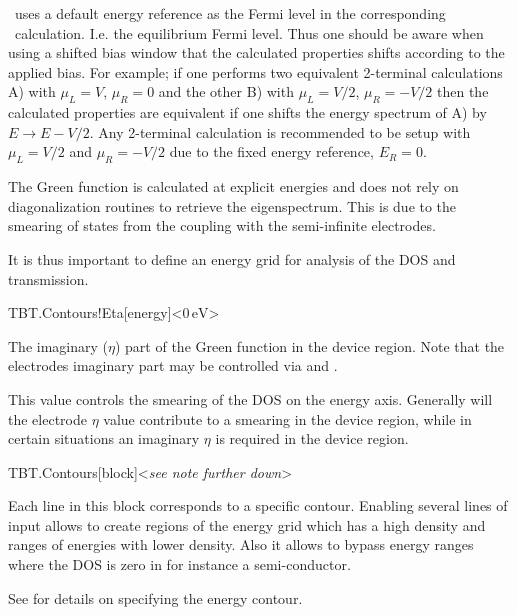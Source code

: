 \tbtrans\ uses a default energy reference as the Fermi level in the
corresponding \tsiesta\ calculation. I.e. the equilibrium Fermi
level. Thus one should be aware when using a shifted bias window that
the calculated properties shifts according to the applied bias. For
example; if one performs two equivalent 2-terminal calculations A)
with $\mu_L=V$, $\mu_R=0$ and the other B) with $\mu_L=V/2$,
$\mu_R=-V/2$ then the calculated properties are equivalent if one
shifts the energy spectrum of A) by $E \to E - V/2$. Any 2-terminal
calculation is recommended to be setup with $\mu_L=V/2$ and
$\mu_R=-V/2$ due to the fixed energy reference, $E_R = 0$.

The Green function is calculated at explicit energies and does not
rely on diagonalization routines to retrieve the eigenspectrum. This
is due to the smearing of states from the coupling with the
semi-infinite electrodes.

It is thus important to define an energy grid for analysis of the DOS
and transmission.

\begin{fdfentry}{TBT.Contours!Eta}[energy]<$0\,\mathrm{eV}$>
  
  The imaginary ($\eta$) part of the Green function in the device
  region. Note that the electrodes imaginary part may be controlled
  via  and .

  This value controls the smearing of the DOS on the energy
  axis. Generally will the electrode $\eta$ value contribute to a
  smearing in the device region, while in certain situations an
  imaginary $\eta$ is required in the device region. 
  
\end{fdfentry}

\begin{fdfentry}{TBT.Contours}[block]<\emph{see note further down}>

  Each line in this block corresponds to a specific contour.
  Enabling several lines of input allows to create regions of the
  energy grid which has a high density and ranges of energies with
  lower density. Also it allows to bypass energy ranges where the DOS
  is zero in for instance a semi-conductor.  

  See  for details on specifying the energy contour.
  
\end{fdfentry}

